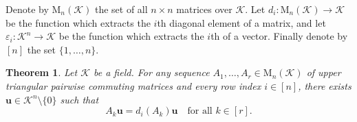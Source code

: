 \documentclass[12pt]{article}
\newtheorem{theorem}{Theorem}
\newcommand{\mc}{\mathcal}
\newcommand{\vek}{\mathbf}
\newcommand{\Mat}{\mathrm{M}}
\begin{document}
Denote by $\Mat_n(\mc{K})$ the set of all $n \times n$ matrices over 
$\mc{K}$. Let \(d_i\colon \Mat_n(\mc{K}) \longrightarrow \mc{K}\) be 
the function which extracts the $i$th diagonal element of a matrix, 
and let \(\varepsilon_i\colon \mc{K}^n \longrightarrow \mc{K}\) be 
the function which extracts the $i$th  
of a vector. Finally denote by $[n]$ the set $\{1,\dotsc,n\}$. 



\begin{theorem}
  Let $\mc{K}$ be a field. 
  For any sequence \(A_1,\dotsc,A_r \in \Mat_n(\mc{K})\) of upper 
  triangular pairwise commuting matrices and every row index 
  \(i \in [n]\), there exists \(\vek{u} \in \mc{K}^n \setminus \{0\}\) 
  such that
  \begin{equation}
    A_k \vek{u} = d_i(A_k) \vek{u}
    \quad\text{for all \(k \in [r]\).}
  \end{equation}
\end{theorem}
\end{document}
